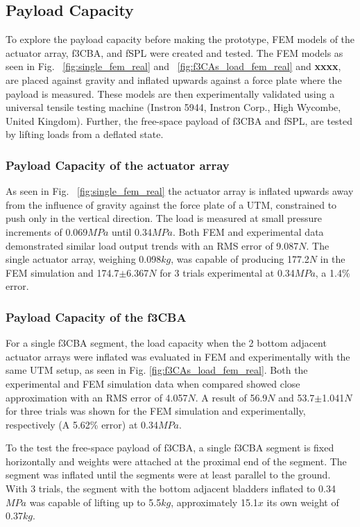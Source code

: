 \documentclass[letterpaper, 10 pt, conference]{ieeeconf}  %
\begin{document}
\subsection{Payload Capacity}

To explore the payload capacity before making the prototype, FEM models of the actuator array, f3CBA, and fSPL were created and tested. The FEM models as seen in Fig. ~\ref{fig:single_fem_real} and ~\ref{fig:f3CAs_load_fem_real} and \textbf{xxxx}, are placed against gravity and inflated upwards against a force plate where the payload is measured. These models are then experimentally validated using a universal tensile testing machine (Instron 5944, Instron Corp., High Wycombe, United Kingdom). Further, the free-space payload of f3CBA and fSPL, are tested by lifting loads from a deflated state. 

\subsubsection{Payload Capacity of the actuator array}
\label{sec:act_array_fem_real}

As seen in Fig. ~\ref{fig:single_fem_real} the actuator array is inflated upwards away from the influence of gravity against the force plate of a UTM, constrained to push only in the vertical direction. The load is measured at small pressure increments of  0.069$MPa$ until 0.34$MPa$. Both FEM and experimental data demonstrated similar load output trends with an RMS error of 9.087$N$. The single actuator array, weighing 0.098$kg$, was capable of producing 177.2$N$ in the FEM simulation and 174.7$\pm$6.367$N$ for 3 trials experimental at 0.34$MPa$, a 1.4\% error. 


\subsubsection{Payload Capacity of the f3CBA}

For a single f3CBA segment, the load capacity when the 2 bottom adjacent actuator arrays were inflated was evaluated in FEM and experimentally with the same UTM setup, as seen in Fig. \ref{fig:f3CAs_load_fem_real}. Both the experimental and FEM simulation data when compared showed close approximation with an RMS error of 4.057$N$. A result of 56.9$N$ and 53.7$\pm$1.041$N$ for three trials was shown for the FEM simulation and experimentally, respectively (A 5.62\% error) at 0.34$MPa$. 

To the test the free-space payload of f3CBA, a single f3CBA segment is fixed horizontally and weights were attached at the proximal end of the segment. The segment was inflated until the segments were at least parallel to the ground. With 3 trials, the segment with the bottom adjacent bladders inflated to 0.34$MPa$ was capable of lifting up to 5.5$kg$, approximately 15.1$x$ its own weight of 0.37$kg$.
\end{document}
